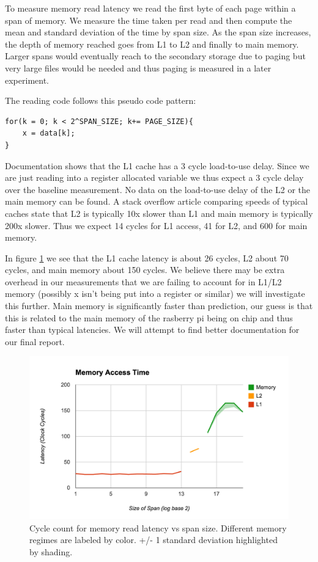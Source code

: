 To measure memory read latency we read the first byte of each page within a span of memory.  
We measure the time taken per read and then compute the mean and standard deviation of the time by span size.
As the span size increases, the depth of memory reached goes from L1 to L2 and finally to main memory.  
Larger spans would eventually reach to the secondary storage due to paging but very large files would be needed and thus paging is measured in a later experiment.

The reading code follows this pseudo code pattern:
\begin{verbatim}
for(k = 0; k < 2^SPAN_SIZE; k+= PAGE_SIZE){
	x = data[k];
}
\end{verbatim}

Documentation shows that the L1 cache has a 3 cycle load-to-use delay.  Since we are just reading into a register allocated variable we thus expect a 3 cycle delay over the baseline measurement.  No data on the load-to-use delay of the L2 or the main memory can be found.  A stack overflow article comparing speeds of typical caches state that L2 is typically 10x slower than L1 and main memory is typically 200x slower.  Thus we expect 14 cycles for L1 access, 41 for L2, and 600 for main memory.

In figure \ref{fig:exp_2_1} we see that the L1 cache latency is about 26 cycles, L2 about 70 cycles, and main memory about 150 cycles.  We believe there may be extra overhead in our measurements that we are failing to account for in L1/L2 memory (possibly x isn't being put into a register or similar) we will investigate this further.  Main memory is significantly faster than prediction, our guess is that this is related to the main memory of the rasberry pi being on chip and thus faster than typical latencies.  We will attempt to find better documentation for our final report.

\begin{figure}[h]
\label{fig:exp_2_1}
\centering
\includegraphics[scale=.5]{experiments/exp_2_1_fig.png}
\caption{Cycle count for memory read latency vs span size.  
Different memory regimes are labeled by color.  +/- 1 standard deviation highlighted by shading.}
\end{figure}
